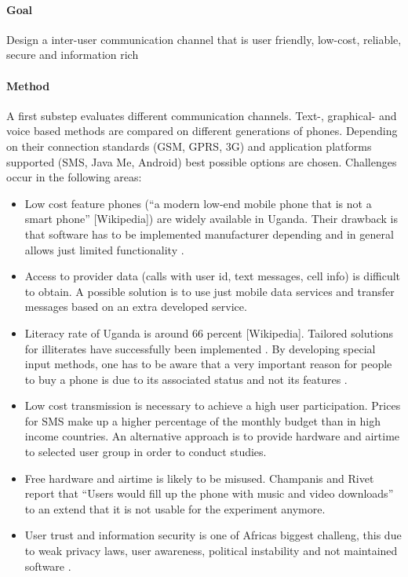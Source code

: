 \documentclass[11pt]{article}
\begin{document}
\paragraph{Goal} Design a inter-user communication channel that is user friendly, low-cost, reliable, secure and information rich
\paragraph{Method} A first substep evaluates different communication channels. Text-, graphical- and voice based methods are compared on different generations of phones. Depending on their connection standards (GSM, GPRS, 3G) and application platforms supported (SMS, Java Me, Android) best possible options are chosen. Challenges occur in the following areas:
\begin{itemize}
 \item Low cost feature phones (``a modern low-end mobile phone that is not a smart phone'' [Wikipedia]) are widely available in Uganda. Their drawback is that software has to be implemented manufacturer depending and in general allows just limited functionality \cite{champanis2012reporting}.
 \item Access to provider data (calls with user id, text messages, cell info) is difficult to obtain. A possible solution is to use just mobile data services and transfer messages based on an extra developed service.
 \item Literacy rate of Uganda is around 66 percent [Wikipedia]. Tailored solutions for illiterates have successfully been implemented \cite{brown2012water}. By developing special input methods, one has to be aware that a very important reason for people to buy a phone is due to its associated status and not its features \cite{knoche2012text}.
 \item Low cost transmission is necessary to achieve a high user participation. Prices for SMS make up a higher percentage of the monthly budget than in high income countries. An alternative approach is to provide hardware and airtime to selected user group in order to conduct studies.
 \item Free hardware and airtime is likely to be misused. Champanis and Rivet report that ``Users would fill up the phone with music and video downloads'' \cite{champanis2012reporting} to an extend that it is not usable for the experiment anymore.
 \item User trust and information security is one of Africas biggest challeng, this due to weak privacy laws, user awareness, political instability and not maintained software \cite{goodman2010coming}.
\end{itemize}
\end{document}
